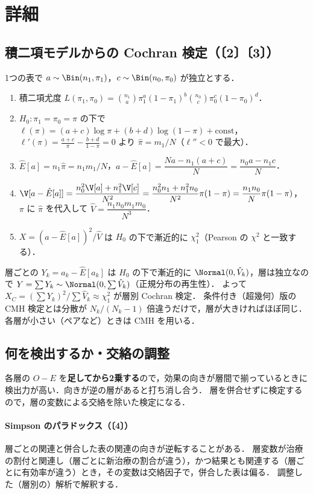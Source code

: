 \section{詳細}\label{sec:m07-shosai}
\subsection{積二項モデルからの Cochran 検定（〔2〕〔3〕）}
1つの表で $a\sim\Bin(n_1,\pi_1)$，$c\sim\Bin(n_0,\pi_0)$ が独立とする．
\begin{enumerate}
\item 積二項尤度 $L(\pi_1,\pi_0)=\binom{n_1}{a}\pi_1^a(1-\pi_1)^{b}\binom{n_0}{c}\pi_0^c(1-\pi_0)^{d}$．
\item $H_0:\pi_1=\pi_0=\pi$ の下で $\ell(\pi)=(a+c)\log\pi+(b+d)\log(1-\pi)+\text{const}$，
      $\ell'(\pi)=\frac{a+c}{\pi}-\frac{b+d}{1-\pi}=0$ より $\hat\pi=m_1/N$（$\ell''<0$ で最大）．
\item $\hat E[a]=n_1\hat\pi=n_1m_1/N$，\quad $a-\hat E[a]=\dfrac{Na-n_1(a+c)}{N}=\dfrac{n_0a-n_1c}{N}$．
\item $\V[a-\hat E[a]]=\dfrac{n_0^2\V[a]+n_1^2\V[c]}{N^2}=\dfrac{n_0^2n_1+n_1^2n_0}{N^2}\pi(1-\pi)=\dfrac{n_1n_0}{N}\pi(1-\pi)$，
      $\pi$ に $\hat\pi$ を代入して $\hat V=\dfrac{n_1n_0m_1m_0}{N^3}$．
\item $X=(a-\hat E[a])^2/\hat V$ は $H_0$ の下で漸近的に $\chi^2_1$（Pearson の $\chi^2$ と一致する）．
\end{enumerate}
層ごとの $Y_k=a_k-\hat E[a_k]$ は $H_0$ の下で漸近的に $\Normal(0,\hat V_k)$，層は独立なので $Y=\sum Y_k\sim\Normal(0,\sum\hat V_k)$（正規分布の再生性）．
よって $X_C=(\sum Y_k)^2/\sum\hat V_k\approx\chi^2_1$ が層別 Cochran 検定．
条件付き（超幾何）版の CMH 検定とは分散が $N_k/(N_k-1)$ 倍違うだけで，層が大きければほぼ同じ．各層が小さい（ペアなど）ときは CMH を用いる．

\subsection{何を検出するか・交絡の調整}
各層の $O-E$ を\textbf{足してから2乗する}ので，効果の向きが層間で揃っているときに検出力が高い．向きが逆の層があると打ち消し合う．
層を併合せずに検定するので，層の変数による交絡を除いた検定になる．
\paragraph{Simpson のパラドックス（〔4〕）}
層ごとの関連と併合した表の関連の向きが逆転することがある．
層変数が治療の割付と関連し（層ごとに新治療の割合が違う），かつ結果とも関連する（層ごとに有効率が違う）とき，その変数は交絡因子で，併合した表は偏る．
調整した（層別の）解析で解釈する．

